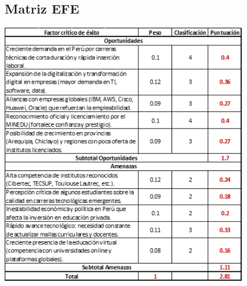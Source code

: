 \documentclass[12pt]{article}
\begin{document}
\subsection*{Matriz EFE}
\begin{center}
  \includegraphics[width=0.8\textwidth]{./assets/matrizEFE.png}
\end{center}
\end{document}
